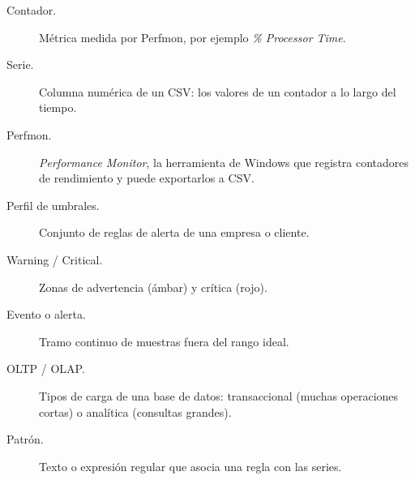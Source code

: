\documentclass[11pt,a4paper,oneside]{report}
\begin{document}
\begin{description}
  \item[Contador.] Métrica medida por Perfmon, por ejemplo
    \emph{\% Processor Time}.
  \item[Serie.] Columna numérica de un CSV: los valores de un contador a lo
    largo del tiempo.
  \item[Perfmon.] \emph{Performance Monitor}, la herramienta de Windows que
    registra contadores de rendimiento y puede exportarlos a CSV.
  \item[Perfil de umbrales.] Conjunto de reglas de alerta de una empresa o
    cliente.
  \item[Warning / Critical.] Zonas de advertencia (ámbar) y crítica (rojo).
  \item[Evento o alerta.] Tramo continuo de muestras fuera del rango ideal.
  \item[OLTP / OLAP.] Tipos de carga de una base de datos: transaccional
    (muchas operaciones cortas) o analítica (consultas grandes).
  \item[Patrón.] Texto o expresión regular que asocia una regla con las
    series.
\end{description}
\end{document}
